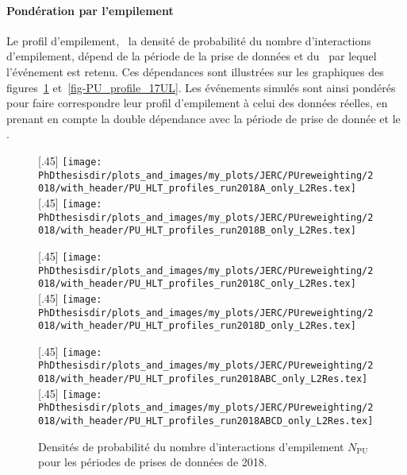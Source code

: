 \paragraph{Pondération par l'empilement}
Le profil d'empilement, \ie\ la densité de probabilité du nombre d'interactions d'empilement, dépend de la période de la prise de données et du \HLTpath\ par lequel l'événement est retenu. Ces dépendances sont illustrées sur les graphiques des figures~\ref{fig-PU_profile_18} et~\ref{fig-PU_profile_17UL}.
Les événements simulés sont ainsi pondérés pour faire correspondre leur profil d'empilement à celui des données réelles, en prenant en compte la double dépendance avec la période de prise de donnée et le \HLTpath.
\begin{figure}[p]
\centering
{}[.45\textwidth]
{\texttt{[image: \\PhDthesisdir/plots\_and\_images/my\_plots/JERC/PUreweighting/2018/with\_header/PU\_HLT\_profiles\_run2018A\_only\_L2Res.tex]}\vspace{-.5\baselineskip}}
\hfill
{}[.45\textwidth]
{\texttt{[image: \\PhDthesisdir/plots\_and\_images/my\_plots/JERC/PUreweighting/2018/with\_header/PU\_HLT\_profiles\_run2018B\_only\_L2Res.tex]}\vspace{-.5\baselineskip}}

\vspace{.75\baselineskip}

[.45\textwidth]
{\texttt{[image: \\PhDthesisdir/plots\_and\_images/my\_plots/JERC/PUreweighting/2018/with\_header/PU\_HLT\_profiles\_run2018C\_only\_L2Res.tex]}\vspace{-.5\baselineskip}}
\hfill
{}[.45\textwidth]
{\texttt{[image: \\PhDthesisdir/plots\_and\_images/my\_plots/JERC/PUreweighting/2018/with\_header/PU\_HLT\_profiles\_run2018D\_only\_L2Res.tex]}\vspace{-.5\baselineskip}}

\vspace{.75\baselineskip}

[.45\textwidth]
{\texttt{[image: \\PhDthesisdir/plots\_and\_images/my\_plots/JERC/PUreweighting/2018/with\_header/PU\_HLT\_profiles\_run2018ABC\_only\_L2Res.tex]}\vspace{-.5\baselineskip}}
\hfill
{}[.45\textwidth]
{\texttt{[image: \\PhDthesisdir/plots\_and\_images/my\_plots/JERC/PUreweighting/2018/with\_header/PU\_HLT\_profiles\_run2018ABCD\_only\_L2Res.tex]}\vspace{-.5\baselineskip}}

\caption[Densités de probabilité de $N_\text{PU}$ pour 2018.]{Densités de probabilité du nombre d'interactions d'empilement $N_\text{PU}$ pour les périodes de prises de données de 2018.}
\label{fig-PU_profile_18}
\end{figure}
